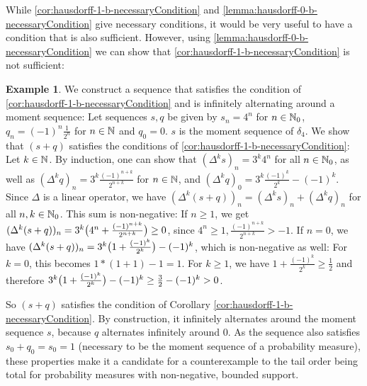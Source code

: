 \documentclass[a4paper]{scrreprt}
\theoremstyle{definition}
\newtheorem{ex}[thm]{Example} %
\begin{document}
    While \ref{cor:hausdorff-1-b-necessaryCondition} and \ref{lemma:hausdorff-0-b-necessaryCondition} give necessary conditions, it would be very useful to have a condition that is also sufficient. However, using \ref{lemma:hausdorff-0-b-necessaryCondition} we can show that \ref{cor:hausdorff-1-b-necessaryCondition} is not sufficient:
    
    \begin{ex}
        We construct a sequence that satisfies the condition of \ref{cor:hausdorff-1-b-necessaryCondition} and is infinitely alternating around a moment sequence:
        Let sequences $s, q$ be given by $s_n = 4^n$ for $n \in \mathbb{N}_0$, $q_n = (-1)^n\frac{1}{2^n}$ for $n \in \mathbb{N}$ and $q_0 = 0$. $s$ is the moment sequence of $\delta_4$. We show that $(s + q)$ satisfies the conditions of \ref{cor:hausdorff-1-b-necessaryCondition}:
        Let $k \in \mathbb{N}$.
        By induction, one can show that $(\Delta^k s)_n = 3^k 4^n$ for all $n \in \mathbb{N}_0$, as well as $(\Delta^k q)_n = 3^k\frac{(-1)^{n+k}}{2^{n+k}}$ for $n \in \mathbb{N}$, and $(\Delta^k q)_0 = 3^k \frac{(-1)^k}{2^k} - (-1)^k$.
        Since $\Delta$ is a linear operator, we have $(\Delta^k (s+q))_n = (\Delta^k s)_n + (\Delta^k q)_n$ for all $n, k \in \mathbb{N}_0$. This sum is non-negative:
        If $n \geq 1$, we get $(\Delta^k (s+q))_n = 3^k\bigl(4^n + \frac{(-1)^{n+k}}{2^{n+k}}\bigr) \geq 0$, since $4^n \geq 1, \frac{(-1)^{n+k}}{2^{n+k}} > -1$.
        If $n = 0$, we have $(\Delta^k (s+q))_n = 3^k\bigl(1 + \frac{(-1)^{k}}{2^{k}}\bigr) - (-1)^k$, which is non-negative as well:
        For $k = 0$, this becomes $1*(1 + 1) - 1 = 1$.
        For $k \geq 1$, we have $1 + \frac{(-1)^{k}}{2^{k}} \geq \frac{1}{2}$ and therefore $3^k\bigl(1 + \frac{(-1)^{k}}{2^{k}}\bigr) - (-1)^k \geq \frac{3}{2} - (-1)^k > 0$.
        
        
        So $(s+q)$ satisfies the condition of Corollary \ref{cor:hausdorff-1-b-necessaryCondition}. 
        By construction, it infinitely alternates around the moment sequence $s$, because $q$ alternates infinitely around 0.
        As the sequence also satisfies $s_0 + q_0 = s_0 = 1$ (necessary to be the moment sequence of a probability measure), these properties make it a candidate for a counterexample to the tail order being total for probability measures with non-negative, bounded support. 
        

\end{ex}
\end{document}
